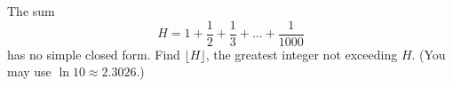 The sum
\[
H=1+\dfrac{1}{2}+\dfrac{1}{3}+\dots+\dfrac{1}{1000}
\]
has no simple closed form. Find $\lfloor H\rfloor$, the greatest integer not exceeding $H$. (You may use $\ln10\approx2.3026$.)
